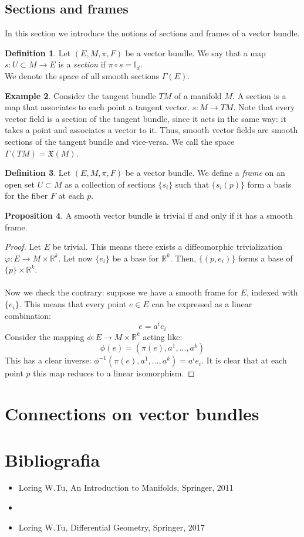 \documentclass[12pt,a4paper]{report}
\theoremstyle{definition}
\newtheorem{Def}{Definition}[chapter]
\theoremstyle{Theorem}
\newtheorem{Prop}[Def]{Proposition}
\theoremstyle{definition}
\newtheorem{Ex}[Def]{Example}
\theoremstyle{definition}
\begin{document}
		
		\section{Sections and frames}
			In this section we introduce the notions of sections and frames of a vector bundle.
		\begin{Def}\label{Def_5.5}
			Let $(E,M,\pi,F)$ be a vector bundle. We say that a map \\$s:U\subset M\rightarrow E$ is a \textit{section} if $\pi\circ s=\mathbb{I}_d$. \\
			We denote the space of all smooth sections $\Gamma(E)$.
		\end{Def}
		\begin{Ex}
			Consider the tangent bundle $TM$ of a manifold $M$. A section is a map that associates to each point a tangent vector. $s:M\rightarrow TM$. Note that every vector field is a section of the tangent bundle, since it acts in the same way: it takes a point and associates a vector to it. Thus, smooth vector fields are smooth sections of the tangent bundle and vice-versa. We call the space $\Gamma(TM)=\mathfrak{X}(M)$.
		\end{Ex}
		\begin{Def}\label{Def_5.6}
			Let $(E,M,\pi,F)$ be a vector bundle. We define a \textit{frame} on an open set $U\subset M$ as a collection of sections $\{s_i\}$ such that $\{s_i(p)\}$ form a basis for the fiber $F$ at each $p$. 
		\end{Def}
		\begin{Prop}
			A smooth vector bundle is trivial if and only if it has a smooth frame.
		\end{Prop}
		\begin{proof}
			Let $E$ be trivial. This means there exists a diffeomorphic trivialization $\varphi:E\rightarrow M\times \mathbb{R}^k$. Let now $\{e_i\}$ be a base for $\mathbb{R}^k$. Then, $\{(p,e_i)\}$ forms a base of $\{p\}\times \mathbb{R}^k$.
			\\\\
			Now we check the contrary: suppose we have a smooth frame for $E$, indexed with $\{e_i\}$. This means that every point $e\in E$ can be expressed as a linear combination:
			$$e=a^ie_i$$
			Consider the mapping $\phi:E\rightarrow M\times\mathbb{R}^k$ acting like:
			$$\phi(e)=(\pi(e),a^1,...,a^k)$$
			This has a clear inverse: $\phi^{-1}(\pi(e),a^1,...,a^k)=a^ie_i$.
			It is clear that at each point $p$ this map reduces to a linear isomorphism.
		\end{proof}
	\chapter{Connections on vector bundles}
\chapter*{Bibliografia}
\begin{itemize}
	\item[$\circ$] [1] Loring W.Tu, An Introduction to Manifolds, Springer, 2011
	\item 	\item[$\circ$] [2] Loring W.Tu, Differential Geometry, Springer, 2017
\end{itemize}
\end{document}
